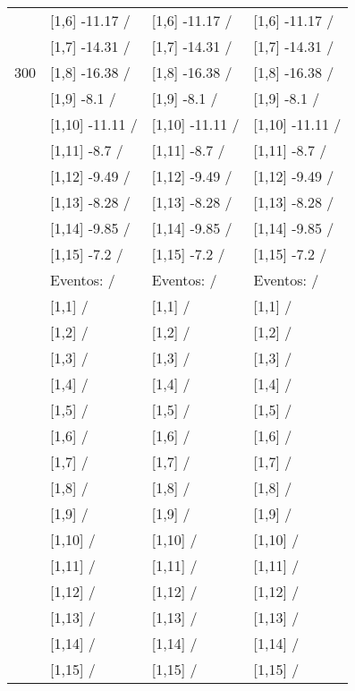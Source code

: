 \begin{table}
\begin{tabular}[t]{llll}
 & {}[1,6] -11.17  / & {}[1,6] -11.17  / & {}[1,6] -11.17  /\\
 & {}[1,7] -14.31  / & {}[1,7] -14.31  / & {}[1,7] -14.31  /\\
300 & {}[1,8] -16.38  / & {}[1,8] -16.38  / & {}[1,8] -16.38  /\\
\addlinespace
 & {}[1,9] -8.1  / & {}[1,9] -8.1  / & {}[1,9] -8.1  /\\
 & {}[1,10] -11.11  / & {}[1,10] -11.11  / & {}[1,10] -11.11  /\\
 & {}[1,11] -8.7  / & {}[1,11] -8.7  / & {}[1,11] -8.7  /\\
 & {}[1,12] -9.49  / & {}[1,12] -9.49  / & {}[1,12] -9.49  /\\
 & {}[1,13] -8.28  / & {}[1,13] -8.28  / & {}[1,13] -8.28  /\\
\addlinespace
 & {}[1,14] -9.85  / & {}[1,14] -9.85  / & {}[1,14] -9.85  /\\
 & {}[1,15] -7.2  / & {}[1,15] -7.2  / & {}[1,15] -7.2  /\\
 & Eventos:   / & Eventos:   / & Eventos:   /\\
 & {}[1,1]  / & {}[1,1]  / & {}[1,1]  /\\
 & {}[1,2]  / & {}[1,2]  / & {}[1,2]  /\\
\addlinespace
 & {}[1,3]  / & {}[1,3]  / & {}[1,3]  /\\
 & {}[1,4]  / & {}[1,4]  / & {}[1,4]  /\\
 & {}[1,5]  / & {}[1,5]  / & {}[1,5]  /\\
 & {}[1,6]  / & {}[1,6]  / & {}[1,6]  /\\
 & {}[1,7]  / & {}[1,7]  / & {}[1,7]  /\\
\addlinespace
500 & {}[1,8]  / & {}[1,8]  / & {}[1,8]  /\\
 & {}[1,9]  / & {}[1,9]  / & {}[1,9]  /\\
 & {}[1,10]  / & {}[1,10]  / & {}[1,10]  /\\
 & {}[1,11]  / & {}[1,11]  / & {}[1,11]  /\\
 & {}[1,12]  / & {}[1,12]  / & {}[1,12]  /\\
\addlinespace
 & {}[1,13]  / & {}[1,13]  / & {}[1,13]  /\\
 & {}[1,14]  / & {}[1,14]  / & {}[1,14]  /\\
 & {}[1,15]  / & {}[1,15]  / & {}[1,15]  /\\
\bottomrule
\end{tabular}
\end{table}
